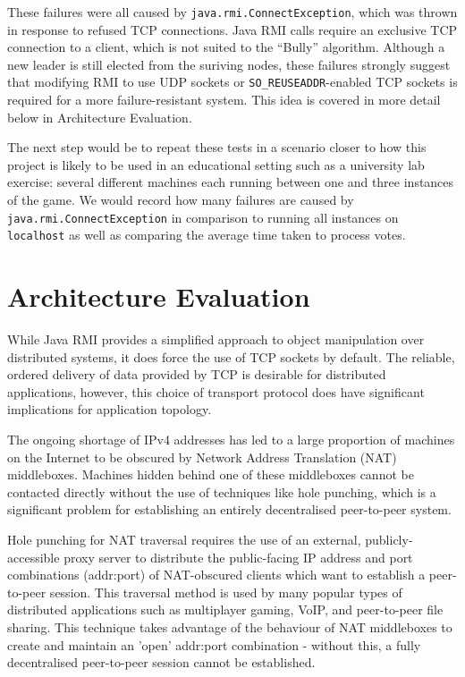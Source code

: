 \documentclass[conference]{IEEEtran}
\begin{document}
These failures were all caused by \texttt{java.rmi.ConnectException}, which was thrown in response to refused TCP connections. Java RMI calls require an exclusive TCP connection to a client, which is not suited to the ``Bully'' algorithm. Although a new leader is still elected from the suriving nodes, these failures strongly suggest that modifying RMI to use UDP sockets or \texttt{SO\_REUSEADDR}-enabled TCP sockets is required for a more failure-resistant system. This idea is covered in more detail below in Architecture Evaluation.

The next step would be to repeat these tests in a scenario closer to how this project is likely to be used in an educational setting such as a university lab exercise: several different machines each running between one and three instances of the game. We would record how many failures are caused by \texttt{java.rmi.ConnectException} in comparison to running all instances on \texttt{localhost} as well as comparing the average time taken to process votes.

\section{Architecture Evaluation}
While Java RMI provides a simplified approach to object manipulation over distributed systems, it does force the use of TCP sockets by default. The reliable, ordered delivery of data provided by TCP is desirable for distributed applications, however, this choice of transport protocol does have significant implications for application topology.

The ongoing shortage of IPv4 addresses has led to a large proportion of machines on the Internet to be obscured by Network Address Translation (NAT) middleboxes. Machines hidden behind one of these middleboxes cannot be contacted directly without the use of techniques like hole punching, which is a significant problem for establishing an entirely decentralised peer-to-peer system.

Hole punching for NAT traversal requires the use of an external, publicly-accessible proxy server to distribute the public-facing IP address and port combinations (addr:port) of NAT-obscured clients which want to establish a peer-to-peer session. This traversal method is used by many popular types of distributed applications such as multiplayer gaming, VoIP, and peer-to-peer file sharing. This technique takes advantage of the behaviour of NAT middleboxes to create and maintain an 'open' addr:port combination - without this, a fully decentralised peer-to-peer session cannot be established.
\end{document}
